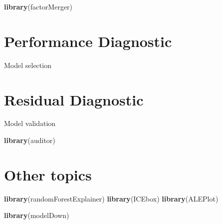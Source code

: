 \documentclass[]{krantz}
\newenvironment{Shaded}{\begin{snugshade}}{\end{snugshade}}
\newcommand{\KeywordTok}[1]{\textcolor[rgb]{0.13,0.29,0.53}{\textbf{#1}}}
\newcommand{\NormalTok}[1]{#1}
\theoremstyle{definition}
\theoremstyle{definition}
\theoremstyle{definition}
\theoremstyle{remark}
\begin{document}
\citep{R-factorMerger}

\begin{Shaded}
\begin{Highlighting}[]
\KeywordTok{library}\NormalTok{(factorMerger)}
\end{Highlighting}
\end{Shaded}

\hypertarget{modelComparisons}{%
\section{Performance Diagnostic}\label{modelComparisons}}

Model selection

\hypertarget{modelAuditing}{%
\section{Residual Diagnostic}\label{modelAuditing}}

Model validation

\citep{R-auditor}

\begin{Shaded}
\begin{Highlighting}[]
\KeywordTok{library}\NormalTok{(auditor)}
\end{Highlighting}
\end{Shaded}

\hypertarget{other-topics}{%
\section{Other topics}\label{other-topics}}

\citep{R-randomForestExplainer} \citep{R-ICEbox} \citep{R-ALEPlot}

\begin{Shaded}
\begin{Highlighting}[]
\KeywordTok{library}\NormalTok{(randomForestExplainer)}
\KeywordTok{library}\NormalTok{(ICEbox)}
\KeywordTok{library}\NormalTok{(ALEPlot)}
\end{Highlighting}
\end{Shaded}

\citep{R-modelDown}

\begin{Shaded}
\begin{Highlighting}[]
\KeywordTok{library}\NormalTok{(modelDown)}
\end{Highlighting}
\end{Shaded}
\end{document}
